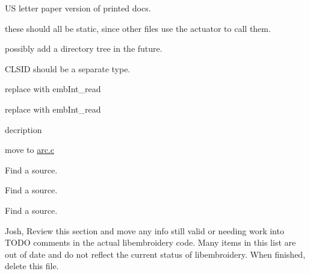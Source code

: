 \begin{DoxyRefList}
\label{todo__todo000186}%
%
US letter paper version of printed docs. 
\item[Member \mbox{\hyperlink{mainwindow_8cpp_ad5968568127868ca300ea8e2c5f85ca4}{about\+\_\+action}} (String args)]\label{todo__todo000006}%
%
these should all be static, since other files use the actuator to call them.  
\item[Member \mbox{\hyperlink{embroidery__internal_8h_a5e0de54ec0ef10b88a4e499bbe94f869}{bcf\+\_\+directory}} ]\label{todo__todo000202}%
%
possibly add a directory tree in the future.  
\item[Member \mbox{\hyperlink{embroidery__internal_8h_a5226ee18f1045aa203f53da9b74d6963}{bcf\+\_\+file\+\_\+header}} ]\label{todo__todo000203}%
%
CLSID should be a separate type.  
\item[Member \mbox{\hyperlink{formats_8c_acaa069d2e820245be0f711415e2c297d}{binary\+Write\+Int}} (FILE $\ast$f, int data)]\label{todo__todo000219}%
%
replace with emb\+Int\+\_\+read  
\item[Member \mbox{\hyperlink{formats_8c_ad56027171faded451118350359c1e8ae}{binary\+Write\+UInt}} (FILE $\ast$f, unsigned int data)]\label{todo__todo000221}%
%
replace with emb\+Int\+\_\+read  
\item[Member \mbox{\hyperlink{main_8c_a5ce4d17e8ed88697e307b1aab8727d3c}{copy\+\_\+trim}} (char const $\ast$s)]\label{todo__todo000225}%
%
decription  
\item[Member \mbox{\hyperlink{main_8c_a16e1e46c5c33874fc9a63476e70c0d66}{emb\+Arc\+\_\+print}} (Emb\+Arc arc)]\label{todo__todo000224}%
%
move to \mbox{\hyperlink{arc_8c}{arc.\+c}}  
\item[File \mbox{\hyperlink{format__art_8c}{format\+\_\+art.c}} ]\label{todo__todo000229}%
%
Find a source.  
\item[File \mbox{\hyperlink{format__bmc_8c}{format\+\_\+bmc.c}} ]\label{todo__todo000230}%
%
Find a source.  
\item[File \mbox{\hyperlink{format__cnd_8c}{format\+\_\+cnd.c}} ]\label{todo__todo000231}%
%
Find a source.  
\item[Page \mbox{\hyperlink{formats}{Formats}} ]\label{todo__todo000187}%
%
Josh, Review this section and move any info still valid or needing work into TODO comments in the actual libembroidery code. Many items in this list are out of date and do not reflect the current status of libembroidery. When finished, delete this file.


\end{DoxyRefList}
